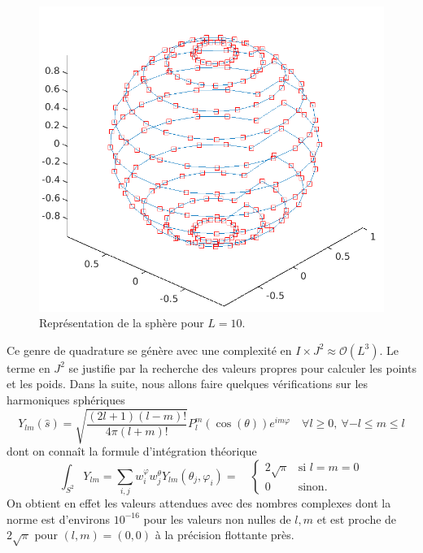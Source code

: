 \documentclass[11pt]{article}
\newcommand{\hs}{\hat{s}}
\begin{document}
\begin{figure}
  \centering
  \includegraphics[height=0.4\textheight]{sphere}
  \caption{Représentation de la sphère pour $L=10$.}
  \label{fig:sph}
\end{figure}

Ce genre de quadrature se génère avec une complexité en $I \times J^2 \approx \mathcal{O}(L^3)$. Le terme en $J^2$ se justifie par la
recherche des valeurs propres pour calculer les points et les poids. Dans la suite, nous allons faire quelques vérifications sur les
harmoniques sphériques
\[
  Y_{lm}(\hs) = \sqrt{\frac{(2l+1)(l-m)!}{4\pi(l+m)!}} P^m_l(\cos(\theta)) e^{im\varphi} \quad \forall l \geq 0,~ \forall -l \leq m \leq l
\]
dont on connaît la formule d'intégration théorique
\[
  \int_{S^2} Y_{lm} = \sum_{i,j} w^\varphi_i w^\theta_j Y_{lm}(\theta_j, \varphi_i) = \quad
  \begin{cases}
    2\sqrt{\pi} & \text{si } l=m=0 \\
    0 & \text{sinon.}
  \end{cases}
\]
On obtient en effet les valeurs attendues avec des nombres complexes dont la norme est d'environs $10^{-16}$ pour les valeurs non nulles de
$l, m$ et est proche de $2\sqrt{\pi}$ pour $(l, m) = (0,0)$ à la précision flottante près.
\end{document}
